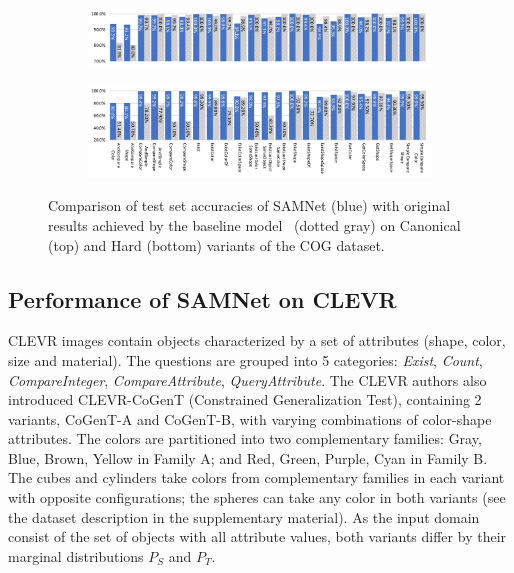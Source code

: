 \begin{figure}[!t]
	\centering
	\begin{subfigure}{\textwidth}
		\centering
		\includegraphics[width=\textwidth]{../img/plots/cog_canonical_baseline_no_labels.pdf}
	\end{subfigure}%
	\newline
	\begin{subfigure}{\textwidth}
		\centering
		\includegraphics[width=\textwidth]{../img/plots/cog_hard_baseline_labels.pdf}
	\end{subfigure}%
	\caption{Comparison of test set accuracies of SAMNet (blue) with original results achieved by the baseline model~\cite{yang2018dataset} (dotted gray) on Canonical (top) and Hard (bottom) variants of the COG dataset.}
	\label{fig:samnet_cog_detailed}\vspace{-10pt}
\end{figure}

\subsection{Performance of SAMNet on CLEVR}
\label{sec:clevr-baseline-compare}
CLEVR images contain objects characterized by a set of attributes (shape, color, size and material). The questions are grouped into 5 categories: \textit{Exist}, \textit{Count}, \textit{CompareInteger}, \textit{CompareAttribute}, \textit{QueryAttribute}.
The CLEVR authors also introduced CLEVR-CoGenT (Constrained Generalization Test), containing 2 variants, CoGenT-A and CoGenT-B, with varying combinations of color-shape attributes.
The colors are partitioned into two complementary families:
Gray, Blue, Brown, Yellow in Family A; and Red, Green, Purple, Cyan in Family B.
The cubes and cylinders take colors from complementary families in each variant with opposite configurations; the spheres can take any color in both variants (see the dataset description in the supplementary material).
As the input domain consist of the set of objects with all attribute values, both variants differ by their marginal distributions $P_S$ and $P_T$.

